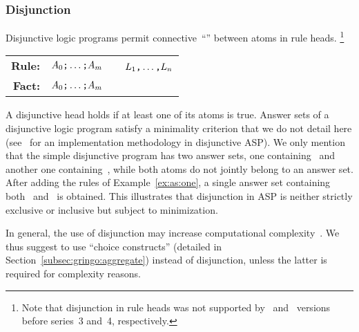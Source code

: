 \subsubsection{Disjunction}\label{subsec:gringo:disjunction}
Disjunctive logic programs permit connective~``\code{;}'' between atoms in rule heads.%
\footnote{Note that disjunction in rule heads was not supported by \clasp\ and \clingo\ versions before series~3 and~4, respectively.}
\par
\medskip
\begin{tabular}{rl@{}l}\label{eq:disjunctive:rule}
\textbf{Rule:} & $A_0\text{\texttt{;}}\dots\text{\texttt{;}}A_m$&~\code{:-}~$L_1\text{\texttt{,}}\dots\text{\texttt{,}}L_n$\code{.}
\\
\textbf{Fact:} & $A_0\text{\texttt{;}}\dots\text{\texttt{;}}A_m$&\code{.}
\end{tabular}
%
%
\par
\medskip
\noindent
A disjunctive head holds if at least one of its atoms is true.
Answer sets of a disjunctive logic program satisfy a minimality criterion
that we do not detail here
(see~\cite{eitpol06a,gekasc11b} for an implementation methodology in disjunctive ASP).
We only mention that the simple disjunctive program  has two answer sets,
one containing~ and another one containing~,
while both atoms do not jointly belong to an answer set.
After adding the rules of Example~\ref{ex:as:one}, a single answer set containing both~ and~ is obtained.
This illustrates that disjunction in ASP is neither strictly exclusive or inclusive but subject to minimization.

In general, the use of disjunction may increase
computational complexity~\cite{eitgot95a}.
We thus suggest to use ``choice constructs'' (detailed in Section~\ref{subsec:gringo:aggregate})
instead of disjunction, unless the latter is required for complexity reasons.

